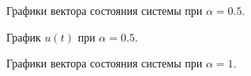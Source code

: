 \begin{figure}[!h]
	\caption{Графики вектора состояния системы при $\alpha = 0.5$.}
	\label{4_2_x_05}
\end{figure}

\begin{figure}[!h]
	\caption{График $u(t)$ при $\alpha = 0.5$.}
	\label{4_2_u_05}
\end{figure}

\begin{figure}[!h]
	\caption{Графики вектора состояния системы при $\alpha = 1$.}
	\label{4_2_x_1}
\end{figure}

